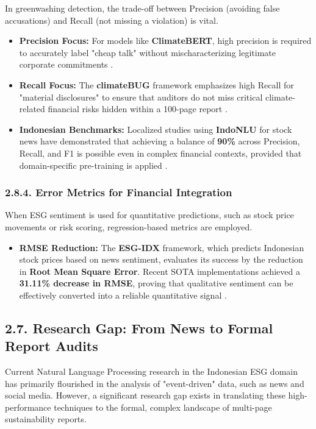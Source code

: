 \documentclass{article}
\begin{document}
In greenwashing detection, the trade-off between Precision (avoiding false accusations) and Recall (not missing a violation) is vital.
\begin{itemize}
\item 

\textbf{Precision Focus:} For models like \textbf{ClimateBERT}, high precision is required to accurately label "cheap talk" without mischaracterizing legitimate corporate commitments  \parencite{julia_bingler_268445e3}.\item 

\textbf{Recall Focus:} The \textbf{climateBUG} framework emphasizes high Recall for "material disclosures" to ensure that auditors do not miss critical climate-related financial risks hidden within a 100-page report  \parencite{yinan_yu_e282fd98}.\item 

\textbf{Indonesian Benchmarks:} Localized studies using \textbf{IndoNLU} for stock news have demonstrated that achieving a balance of \textbf{90\%} across Precision, Recall, and F1 is possible even in complex financial contexts, provided that domain-specific pre-training is applied  \parencite{muhammad_riza_alifi_66b78fb0}.
\end{itemize}
\subsubsection*{2.8.4. Error Metrics for Financial Integration}

When ESG sentiment is used for quantitative predictions, such as stock price movements or risk scoring, regression-based metrics are employed.
\begin{itemize}
\item 

\textbf{RMSE Reduction:} The \textbf{ESG-IDX} framework, which predicts Indonesian stock prices based on news sentiment, evaluates its success by the reduction in \textbf{Root Mean Square Error}. Recent SOTA implementations achieved a \textbf{31.11\% decrease in RMSE}, proving that qualitative sentiment can be effectively converted into a reliable quantitative signal  \parencite{ubaidillah_ariq_prathama_a1856e2f}.
\end{itemize}
\subsection*{2.7. Research Gap: From News to Formal Report Audits}

Current Natural Language Processing research in the Indonesian ESG domain has primarily flourished in the analysis of "event-driven" data, such as news and social media. However, a significant research gap exists in translating these high-performance techniques to the formal, complex landscape of multi-page sustainability reports.
\end{document}

